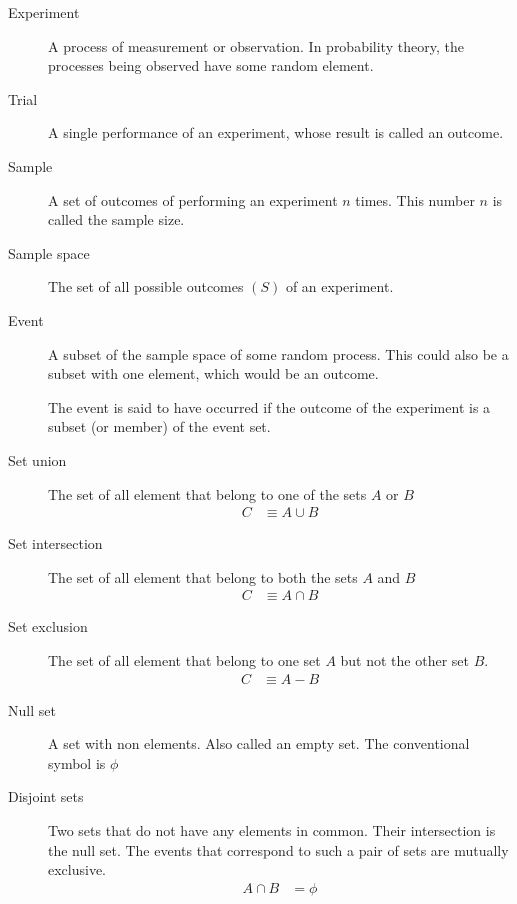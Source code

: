 \begin{description}
    \item[Experiment] A process of measurement or observation. In probability theory,
          the processes being observed have some random element.

    \item[Trial] A single performance of an experiment, whose result is called an
          outcome.

    \item[Sample] A set of outcomes of performing an experiment $ n $ times. This number
          $ n $ is called the sample size.

    \item[Sample space] The set of all possible outcomes $ (S) $ of an experiment.

    \item[Event] A subset of the sample space of some random process. This could also
          be a subset with one element, which would be an outcome. \par
          The event is said to have occurred if the outcome of the experiment is a subset
          (or member) of the event set.

    \item[Set union] The set of all element that belong to one of the sets $ A $
          or $ B $
          \begin{align}
              C & \equiv A \cup B
          \end{align}

    \item[Set intersection] The set of all element that belong to both the sets $ A $ and
          $ B $
          \begin{align}
              C & \equiv A \cap B
          \end{align}

    \item[Set exclusion] The set of all element that belong to one set $ A $ but not
          the other set $ B $.
          \begin{align}
              C & \equiv A - B
          \end{align}

    \item[Null set] A set with non elements. Also called an empty set. The
          conventional symbol is $ \phi $

    \item[Disjoint sets] Two sets that do not have any elements in common. Their
          intersection is the null set. The events that correspond to such a pair of sets
          are mutually exclusive.
          \begin{align}
              A \cap B & = \phi
          \end{align}


\end{description}
